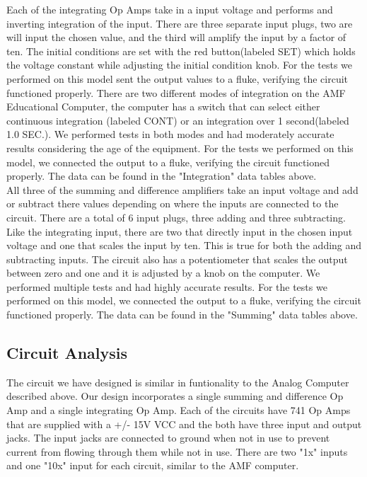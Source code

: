 \documentclass[11pt]{article}
\begin{document}
	Each of the integrating Op Amps take in a input voltage and performs and inverting integration of the input. There are three separate input plugs, two are will input the chosen value, and the third will amplify the input by a factor of ten. The initial conditions are set with the red button(labeled SET) which holds the voltage constant while adjusting the initial condition knob. For the tests we performed on this model sent the output values to a fluke, verifying the circuit functioned properly. There are two different modes of integration on the AMF Educational Computer, the computer has a switch that can select either continuous integration (labeled CONT) or an integration over 1 second(labeled 1.0 SEC.). We performed tests in both modes and had moderately accurate results considering the age of the equipment. For the tests we performed on this model, we connected the output to a fluke, verifying the circuit functioned properly. The data can be found in the "Integration" data tables above. \\
	
	All three of the summing and difference amplifiers take an input voltage and add or subtract there values depending on where the inputs are connected to the circuit. There are a total of 6 input plugs, three adding and three subtracting. Like the integrating input, there are two  that directly input in the chosen input voltage and one that scales the input by ten. This is true for both the adding and subtracting inputs. The circuit also has a potentiometer that scales the output between zero and one and it is adjusted by a knob on the computer. We performed multiple tests and had highly accurate results. For the tests we performed on this model, we connected the output to a fluke, verifying the circuit functioned properly. The data can be found in the "Summing" data tables above.

\subsection*{Circuit Analysis}
	The circuit we have designed is similar in funtionality to the Analog Computer described above. Our design incorporates a single summing and difference Op Amp and a single integrating Op Amp. Each of the circuits have 741 Op Amps that are supplied with a +/- 15V VCC and the both have three input and output jacks.  The input jacks are connected to ground when not in use to prevent current from flowing through them while not in use. There are two "1x" inputs and one "10x" input for each circuit, similar to the AMF computer.
	
\end{document}
